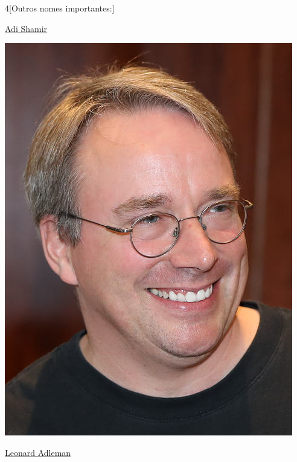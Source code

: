 \begin{multicols}{4}[Outros nomes importantes:]
\vfill\null

\columnbreak				
				
				\href{https://pt.wikipedia.org/wiki/Adi_Shamir}{Adi Shamir}
				
\begin{center}
					\includegraphics[width=.8\columnwidth]{./IMG-GIT/CIENTISTAS/linus.jpeg}
\end{center}
				
\vfill\null

\columnbreak				
				
				\href{https://pt.wikipedia.org/wiki/Leonard_Adleman}{Leonard Adleman}
				

\end{multicols}
